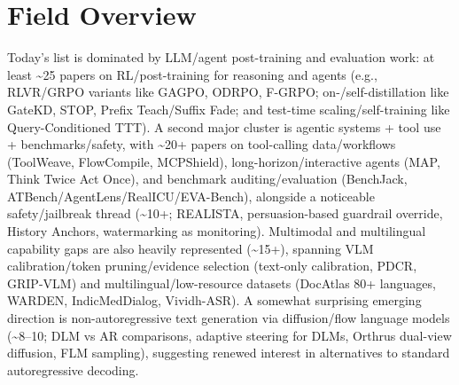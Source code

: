 \documentclass[12pt,letterpaper]{article}
\begin{document}
\medskip



\section*{Field Overview}
{\footnotesize Today's list is dominated by LLM/agent post-training and evaluation work: at least \textasciitilde{}25 papers on RL/post-training for reasoning and agents (e.g., RLVR/GRPO variants like GAGPO, ODRPO, F-GRPO; on-/self-distillation like GateKD, STOP, Prefix Teach/Suffix Fade; and test-time scaling/self-training like Query-Conditioned TTT). A second major cluster is agentic systems + tool use + benchmarks/safety, with \textasciitilde{}20+ papers on tool-calling data/workflows (ToolWeave, FlowCompile, MCPShield), long-horizon/interactive agents (MAP, Think Twice Act Once), and benchmark auditing/evaluation (BenchJack, ATBench/AgentLens/RealICU/EVA-Bench), alongside a noticeable safety/jailbreak thread (\textasciitilde{}10+; REALISTA, persuasion-based guardrail override, History Anchors, watermarking as monitoring). Multimodal and multilingual capability gaps are also heavily represented (\textasciitilde{}15+), spanning VLM calibration/token pruning/evidence selection (text-only calibration, PDCR, GRIP-VLM) and multilingual/low-resource datasets (DocAtlas 80+ languages, WARDEN, IndicMedDialog, Vividh-ASR). A somewhat surprising emerging direction is non-autoregressive text generation via diffusion/flow language models (\textasciitilde{}8--10; DLM vs AR comparisons, adaptive steering for DLMs, Orthrus dual-view diffusion, FLM sampling), suggesting renewed interest in alternatives to standard autoregressive decoding.}
\end{document}
